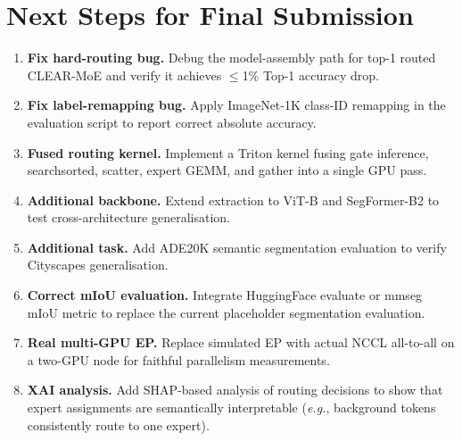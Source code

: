 \documentclass[12pt,a4paper]{article}
\newcommand{\eg}{\emph{e.g.}}
\begin{document}
\section{Next Steps for Final Submission}
\label{sec:future}

\begin{enumerate}
\item \textbf{Fix hard-routing bug.} Debug the model-assembly path for top-1 routed CLEAR-MoE and verify it achieves $\leq$1\% Top-1 accuracy drop.
\item \textbf{Fix label-remapping bug.} Apply ImageNet-1K class-ID remapping in the evaluation script to report correct absolute accuracy.
\item \textbf{Fused routing kernel.} Implement a Triton kernel fusing gate inference, searchsorted, scatter, expert GEMM, and gather into a single GPU pass.
\item \textbf{Additional backbone.} Extend extraction to ViT-B and SegFormer-B2 to test cross-architecture generalisation.
\item \textbf{Additional task.} Add ADE20K semantic segmentation evaluation to verify Cityscapes generalisation.
\item \textbf{Correct mIoU evaluation.} Integrate HuggingFace evaluate or mmseg mIoU metric to replace the current placeholder segmentation evaluation.
\item \textbf{Real multi-GPU EP.} Replace simulated EP with actual NCCL all-to-all on a two-GPU node for faithful parallelism measurements.
\item \textbf{XAI analysis.} Add SHAP-based analysis of routing decisions to show that expert assignments are semantically interpretable (\eg, background tokens consistently route to one expert).
\end{enumerate}
\end{document}
